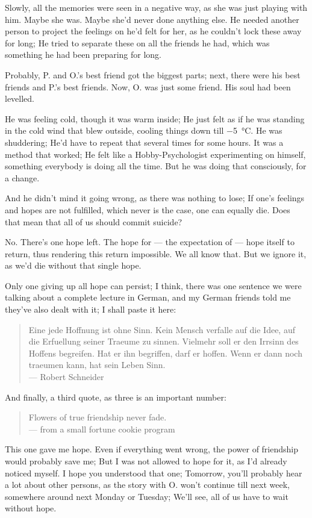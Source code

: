 Slowly, all the memories were seen in a negative way, as she was just playing with him. 
Maybe she was. 
Maybe she'd never done anything else. 
He needed another person to project the feelings on he'd felt for her, as he couldn't lock these away for long; He tried to separate these on all the friends he had, which was something he had been preparing for long.

Probably, P. and O.'s best friend got the biggest parts; next, there were his best friends and P.'s best friends. Now, O. was just some friend. 
His soul had been levelled.

He was feeling cold, though it was warm inside; He just felt as if he was standing in the cold wind that blew outside, cooling things down till \SI{-5}{\celsius}. 
He was shuddering; He'd have to repeat that several times for some hours. 
It was a method that worked; He felt like a Hobby-Psychologist experimenting on himself, something everybody is doing all the time. 
But he was doing that consciously, for a change.

And he didn't mind it going wrong, as there was nothing to lose; If one's feelings and hopes are not fulfilled, which never is the case, one can equally die. 
Does that mean that all of us should commit suicide?

No.
There's one hope left. 
The hope for --- the expectation of --- hope itself to return, thus rendering this return impossible. 
We all know that.
But we ignore it, as we'd die without that single hope.

Only one giving up all hope can persist; I think, there was one sentence we were talking about a complete lecture in German, and my German friends told me they've also dealt with it; I shall paste it here: 
\begin{quote}
Eine jede Hoffnung ist ohne Sinn. Kein Mensch verfalle auf die Idee, auf die Erfuellung seiner Traeume zu sinnen. Vielmehr soll er den Irrsinn des Hoffens begreifen. Hat er ihn begriffen, darf er hoffen. Wenn er dann noch traeumen kann, hat sein Leben Sinn.\\
--- Robert Schneider
\end{quote}
And finally, a third quote, as three is an important number: 
\begin{quote}
Flowers of true friendship never fade.\\
--- from a small fortune cookie program
\end{quote}
This one gave me hope. Even if everything went wrong, the power of friendship would probably save me; But I was not allowed to hope for it, as I'd already noticed myself. 
I hope you understood that one; Tomorrow, you'll probably hear a lot about other persons, as the story with O. won't continue till next week, somewhere around next Monday or Tuesday; We'll see, all of us have to wait without hope.

